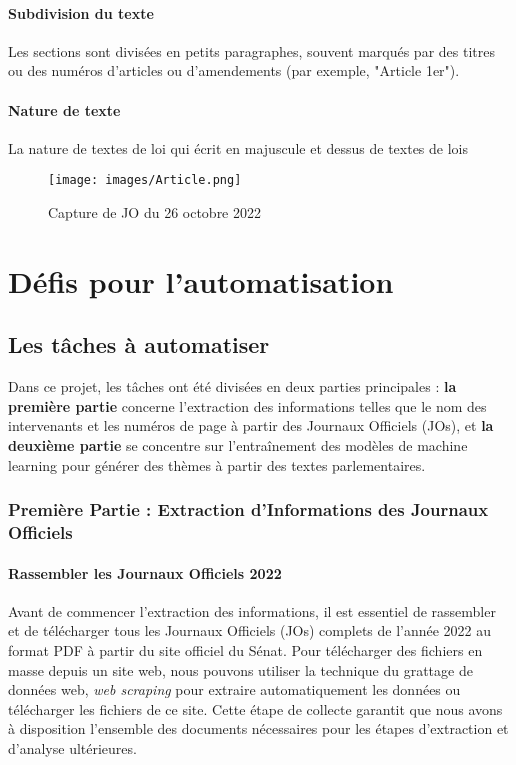 \paragraph{Subdivision du texte} Les sections sont divisées en petits paragraphes, souvent marqués par des titres ou des numéros d’articles ou d’amendements (par exemple, "Article 1er").

\paragraph{Nature de texte} La nature de textes de loi qui écrit en majuscule et dessus de textes de lois

\begin{figure}[H]
    \centering
    \texttt{[image: images/Article.png]}
    \caption{Capture de JO du 26 octobre 2022}
\end{figure}

\section{Défis pour l’automatisation}

\subsection{Les tâches à automatiser}

Dans ce projet, les tâches ont été divisées en deux parties principales : \textbf{la première partie} concerne l'extraction des informations telles que le nom des intervenants et les numéros de page à partir des Journaux Officiels (JOs), et \textbf{la deuxième partie} se concentre sur l'entraînement des modèles de machine learning pour générer des thèmes à partir des textes parlementaires.

\subsubsection{Première Partie : Extraction d'Informations des Journaux Officiels}

\paragraph{Rassembler les Journaux Officiels 2022}  
Avant de commencer l'extraction des informations, il est essentiel de rassembler et de télécharger tous les Journaux Officiels (JOs) complets de l'année 2022 au format \gls{PDF} à partir du site officiel du Sénat. Pour télécharger des fichiers en masse depuis un site web, nous pouvons utiliser la technique du grattage de données web, \textit{web scraping} pour extraire automatiquement les données ou télécharger les fichiers de ce site. Cette étape de collecte garantit que nous avons à disposition l'ensemble des documents nécessaires pour les étapes d'extraction et d'analyse ultérieures. 

